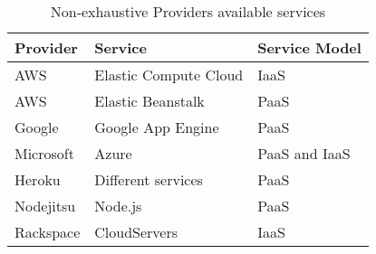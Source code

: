 \begin{table}
  \begin{tabular}{ | l | l | l | }
    \hline
    \textbf{Provider} & \textbf{Service} & \textbf{Service Model} \\ \hline
    AWS & Elastic Compute Cloud & IaaS \\ \hline
    AWS & Elastic Beanstalk & PaaS \\ \hline
    Google & Google App Engine & PaaS \\ \hline
    Microsoft & Azure & PaaS and IaaS \\ \hline
    Heroku & Different services & PaaS \\ \hline
    Nodejitsu & Node.js & PaaS \\ \hline
    Rackspace & CloudServers & IaaS \\ \hline
  \end{tabular}
  \caption{Non-exhaustive Providers available services}
  \label{table:providerservices}
\end{table}

